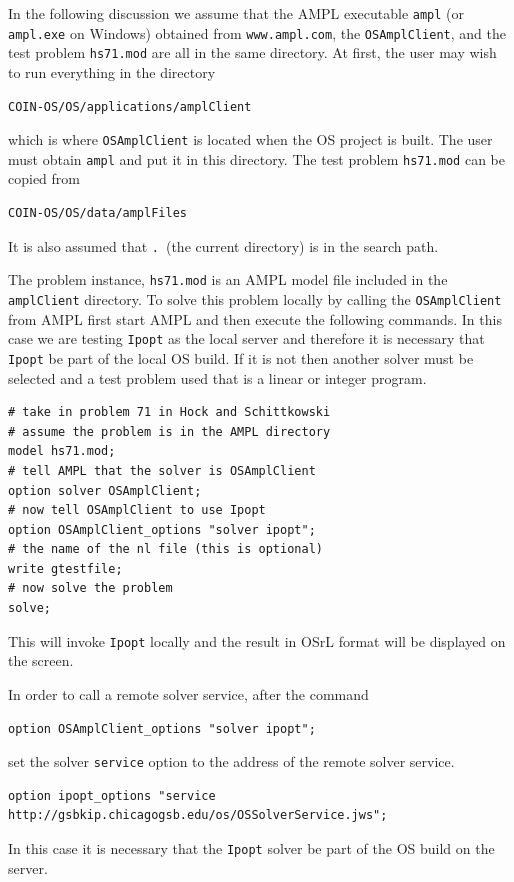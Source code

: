 \documentclass[11pt]{article}
\renewcommand{\_}{{\char"5F}}
\renewcommand{\{}{{\char"7B}}
\renewcommand{\}}{{\char"7D}}
\renewcommand{\^}{{\char"0D}}
\renewcommand{\'}{{\char"0D}}
\begin{document}
\begin{enumerate}[Step 1:]
In the following discussion we assume that the AMPL executable {\tt ampl}  (or {\tt ampl.exe} on Windows) obtained
from {\tt www.ampl.com}, the {\tt OSAmplClient}, and the test problem {\tt hs71.mod} are all in the same directory.
At first, the user may wish to run everything in the directory

\begin{verbatim}
COIN-OS/OS/applications/amplClient
\end{verbatim}
which is where {\tt OSAmplClient} is located when the OS project is built. The user must obtain {\tt ampl} and put
it in this directory.  The test problem {\tt hs71.mod} can be copied from

\begin{verbatim}
COIN-OS/OS/data/amplFiles
\end{verbatim}
It is also assumed that {\tt .}~(the current directory) is in the search path.

The  problem instance, {\tt hs71.mod} is an AMPL model file included in the {\tt amplClient} directory.
To solve this problem locally by calling the {\tt OSAmplClient} from AMPL first start AMPL and then
execute the following commands. In this case we are testing  {\tt Ipopt} as the
local server and therefore it is necessary that {\tt Ipopt} be part of the local OS build. If it is not
then another solver must be selected and a test problem used that is a linear or integer program.

\begin{verbatim}
# take in problem 71 in Hock and Schittkowski
# assume the problem is in the AMPL directory
model hs71.mod;
# tell AMPL that the solver is OSAmplClient
option solver OSAmplClient;
# now tell OSAmplClient to use Ipopt
option OSAmplClient_options "solver ipopt";
# the name of the nl file (this is optional)
write gtestfile;
# now solve the problem
solve;
\end{verbatim}

This will invoke {\tt Ipopt} locally and the result in OSrL format will be displayed on the screen.

In order to call a remote solver service, after the command
\begin{verbatim}
option OSAmplClient_options "solver ipopt";
\end{verbatim}
set the solver {\tt service} option to  the address of the remote solver service.
\begin{verbatim}
option ipopt_options "service http://gsbkip.chicagogsb.edu/os/OSSolverService.jws";
\end{verbatim}
In this case it is necessary that the {\tt Ipopt} solver be part of the OS build on the server.



\end{enumerate}
\end{document}
